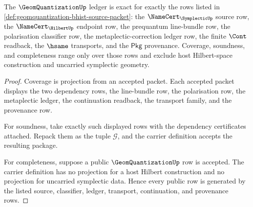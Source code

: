 \begin{theorem}
\label{thm:geomquantization-ledger-exactness}
The $\GeomQuantizationUp$ ledger is exact for exactly the rows listed in \autoref{def:geomquantization-bhist-source-packet}: the $\NameCert_{\SymplecticUp}$ source row, the $\NameCert_{\HilbertUp}$ endpoint row, the prequantum line-bundle row, the polarisation classifier row, the metaplectic-correction ledger row, the finite $\Cont$ readback, the $\hsame$ transports, and the $\mathsf{Pkg}$ provenance. Coverage, soundness, and completeness range only over those rows and exclude host Hilbert-space construction and uncarried symplectic geometry.
\end{theorem}
\begin{proof}
Coverage is projection from an accepted packet. Each accepted packet displays the two dependency rows, the line-bundle row, the polarisation row, the metaplectic ledger, the continuation readback, the transport family, and the provenance row.

For soundness, take exactly such displayed rows with the dependency certificates attached. Repack them as the tuple $\mathcal{G}$, and the carrier definition accepts the resulting package.

For completeness, suppose a public $\GeomQuantizationUp$ row is accepted. The carrier definition has no projection for a host Hilbert construction and no projection for uncarried symplectic data. Hence every public row is generated by the listed source, classifier, ledger, transport, continuation, and provenance rows.
\end{proof}

